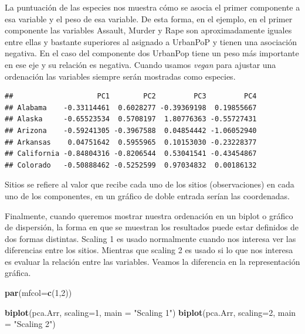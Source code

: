 \documentclass[]{book}
\newenvironment{Shaded}{\begin{snugshade}}{\end{snugshade}}
\newcommand{\KeywordTok}[1]{\textcolor[rgb]{0.13,0.29,0.53}{\textbf{{#1}}}}
\newcommand{\DataTypeTok}[1]{\textcolor[rgb]{0.13,0.29,0.53}{{#1}}}
\newcommand{\DecValTok}[1]{\textcolor[rgb]{0.00,0.00,0.81}{{#1}}}
\newcommand{\StringTok}[1]{\textcolor[rgb]{0.31,0.60,0.02}{{#1}}}
\newcommand{\CommentTok}[1]{\textcolor[rgb]{0.56,0.35,0.01}{\textit{{#1}}}}
\newcommand{\NormalTok}[1]{{#1}}
\begin{document}
La puntuación de las especies nos muestra cómo se asocia el primer
componente a esa variable y el peso de esa variable. De esta forma, en
el ejemplo, en el primer componente las variables Assault, Murder y Rape
son aproximadamente iguales entre ellas y bastante superiores al
asignado a UrbanPoP y tienen una asociación negativa. En el caso del
componente dos UrbanPop tiene un peso más importante en ese eje y su
relación es negativa. Cuando usamos \emph{vegan} para ajustar una
ordenación las variables siempre serán mostradas como especies.

\begin{Shaded}
\end{Shaded}

\begin{verbatim}
##                    PC1        PC2         PC3         PC4
## Alabama    -0.33114461  0.6028277 -0.39369198  0.19855667
## Alaska     -0.65523534  0.5708197  1.80776363 -0.55727431
## Arizona    -0.59241305 -0.3967588  0.04854442 -1.06052940
## Arkansas    0.04751642  0.5955965  0.10153030 -0.23228377
## California -0.84804316 -0.8206544  0.53041541 -0.43454867
## Colorado   -0.50888462 -0.5252599  0.97034832  0.00186132
\end{verbatim}

Sitios se refiere al valor que recibe cada uno de los sitios
(observaciones) en cada uno de los componentes, en un gráfico de doble
entrada serían las coordenadas.

Finalmente, cuando queremos mostrar nuestra ordenación en un biplot o
gráfico de dispersión, la forma en que se muestran los resultados puede
estar definidos de dos formas distintas. Scaling 1 es usado normalmente
cuando nos interesa ver las diferencias entre los sitios. Mientras que
scaling 2 es usado si lo que nos interesa es evaluar la relación entre
las variables. Veamos la diferencia en la representación gráfica.

\begin{Shaded}
\begin{Highlighting}[]
\KeywordTok{par}\NormalTok{(}\DataTypeTok{mfcol=}\KeywordTok{c}\NormalTok{(}\DecValTok{1}\NormalTok{,}\DecValTok{2}\NormalTok{))}

\KeywordTok{biplot}\NormalTok{(pca.Arr, }\DataTypeTok{scaling=}\DecValTok{1}\NormalTok{, }\DataTypeTok{main =} \StringTok{"Scaling 1"}\NormalTok{)}
\KeywordTok{biplot}\NormalTok{(pca.Arr, }\DataTypeTok{scaling=}\DecValTok{2}\NormalTok{, }\DataTypeTok{main =} \StringTok{"Scaling 2"}\NormalTok{)}
\end{Highlighting}
\end{Shaded}
\end{document}
